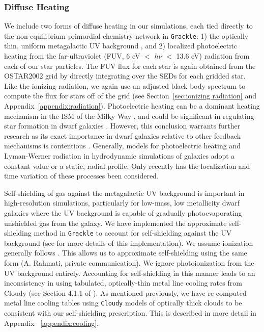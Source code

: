 \documentclass[twocolumn]{aastex61}
\begin{document}
\subsubsection{Diffuse  Heating}
\label{sec:diffusive heating}
We include two forms of diffuse heating in our simulations, each tied directly to the non-equilibrium primordial chemistry network in \texttt{Grackle}: 1) the optically thin, uniform metagalactic UV background \citep{HM2012}, and 2) localized photoelectric heating from the far-ultraviolet (FUV, 6 eV $<$ $h\nu$ $<$ 13.6 eV) radiation from each of our star particles. The FUV flux for each star is again obtained from the OSTAR2002 grid by directly integrating over the SEDs for each gridded star. Like the ionizing radiation, we again use an adjusted black body spectrum to compute the flux for stars off of the grid (see Section~\ref{sec:ionizing radiation} and Appendix~\ref{appendix:radiation}). Photoelectric heating can be a dominant heating mechanism in the ISM of the Milky Way \citep{Parravano2003}, and could be significant in regulating star formation in dwarf galaxies \citep{Forbes2016}. However, this conclusion warrants further research as its exact importance in dwarf galaxies relative to other feedback mechanisms is contentious \citep{Hu2016,Hu2017}. Generally, models for photoelectric heating and Lyman-Werner radiation in hydrodynamic simulations of galaxies adopt a constant value or a static, radial profile. Only recently has the localization and time variation of these processes been considered.

Self-shielding of gas against the metagalactic UV background is important in high-resolution simulations, particularly for low-mass, low metallicity dwarf galaxies where the UV background is capable of gradually photoevaporating unshielded gas from the galaxy. We have implemented the \citet{Rahmati2013} approximate self-shielding method in \texttt{Grackle} to account for  self-shielding against the UV background (see \citep{GrackleMethod} for more details of this implementation). We assume  ionization generally follows . This allows us to approximate  self-shielding using the same form (A. Rahmati, private communication). We ignore  photoionization from the UV background entirely. Accounting for self-shielding in this manner leads to an inconsistency in using tabulated, optically-thin metal line cooling rates from Cloudy (see Section 4.1.1 of \citet{Hu2017}). As mentioned previously, we have re-computed metal line cooling tables using \texttt{Cloudy} models of optically thick clouds to be consistent with our self-shielding prescription. This is described in more detail in Appendix ~\ref{appendix:cooling}. 
\end{document}
